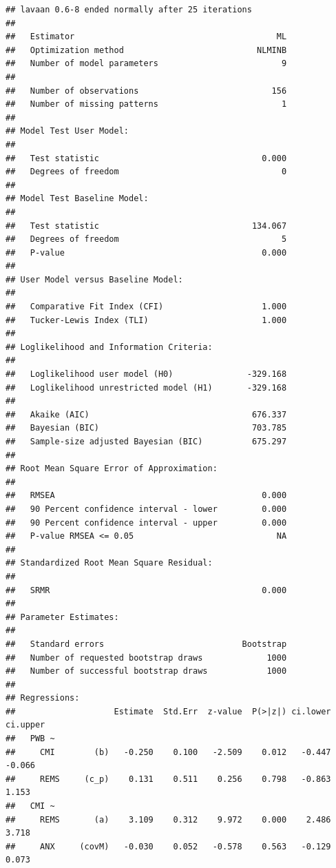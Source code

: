 \documentclass[
  english,
]{book}
\begin{document}
\begin{verbatim}
## lavaan 0.6-8 ended normally after 25 iterations
## 
##   Estimator                                         ML
##   Optimization method                           NLMINB
##   Number of model parameters                         9
##                                                       
##   Number of observations                           156
##   Number of missing patterns                         1
##                                                       
## Model Test User Model:
##                                                       
##   Test statistic                                 0.000
##   Degrees of freedom                                 0
## 
## Model Test Baseline Model:
## 
##   Test statistic                               134.067
##   Degrees of freedom                                 5
##   P-value                                        0.000
## 
## User Model versus Baseline Model:
## 
##   Comparative Fit Index (CFI)                    1.000
##   Tucker-Lewis Index (TLI)                       1.000
## 
## Loglikelihood and Information Criteria:
## 
##   Loglikelihood user model (H0)               -329.168
##   Loglikelihood unrestricted model (H1)       -329.168
##                                                       
##   Akaike (AIC)                                 676.337
##   Bayesian (BIC)                               703.785
##   Sample-size adjusted Bayesian (BIC)          675.297
## 
## Root Mean Square Error of Approximation:
## 
##   RMSEA                                          0.000
##   90 Percent confidence interval - lower         0.000
##   90 Percent confidence interval - upper         0.000
##   P-value RMSEA <= 0.05                             NA
## 
## Standardized Root Mean Square Residual:
## 
##   SRMR                                           0.000
## 
## Parameter Estimates:
## 
##   Standard errors                            Bootstrap
##   Number of requested bootstrap draws             1000
##   Number of successful bootstrap draws            1000
## 
## Regressions:
##                    Estimate  Std.Err  z-value  P(>|z|) ci.lower ci.upper
##   PWB ~                                                                 
##     CMI        (b)   -0.250    0.100   -2.509    0.012   -0.447   -0.066
##     REMS     (c_p)    0.131    0.511    0.256    0.798   -0.863    1.153
##   CMI ~                                                                 
##     REMS       (a)    3.109    0.312    9.972    0.000    2.486    3.718
##     ANX     (covM)   -0.030    0.052   -0.578    0.563   -0.129    0.073

\end{verbatim}
\end{document}
